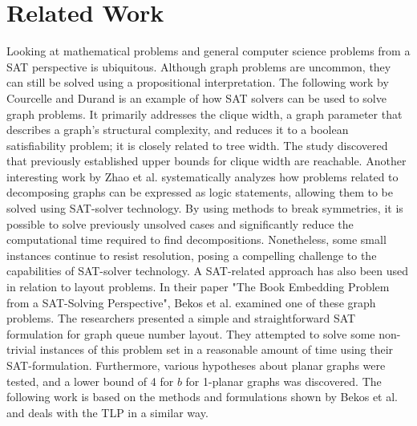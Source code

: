 \documentclass[bachelor, english]{algothesis}
\begin{document}
\section{Related Work}
Looking at mathematical problems and general computer science problems from a SAT perspective is ubiquitous. Although graph problems are uncommon, they can still be solved using a propositional interpretation. The following work by Courcelle and Durand \cite{courcelle:hal-03668884} is an example of how SAT solvers can be used to solve graph problems. It primarily addresses the clique width, a graph parameter that describes a graph's structural complexity, and reduces it to a boolean satisfiability problem; it is closely related to tree width. The study discovered that previously established upper bounds for clique width are reachable. 
\newline
Another interesting work by Zhao et al. \cite{decomposing} systematically analyzes how problems related to decomposing graphs can be expressed as logic statements, allowing them to be solved using SAT-solver technology. By using methods to break symmetries, it is possible to solve previously unsolved cases and significantly reduce the computational time required to find decompositions. Nonetheless, some small instances continue to resist resolution, posing a compelling challenge to the capabilities of SAT-solver technology.
\newline 
A SAT-related approach has also been used in relation to layout problems.
In their paper "The Book Embedding Problem from a SAT-Solving Perspective", Bekos et al. \cite{book_embedding_sat} examined one of these graph problems. The researchers presented a simple and straightforward SAT formulation for graph queue number layout. They attempted to solve some non-trivial instances of this problem set in a reasonable amount of time using their SAT-formulation. Furthermore, various hypotheses about planar graphs were tested, and a lower bound of 4 for $b$ for 1-planar graphs was discovered. The following work is based on the methods and formulations shown by Bekos et al. and deals with the TLP in a similar way.
\end{document}
